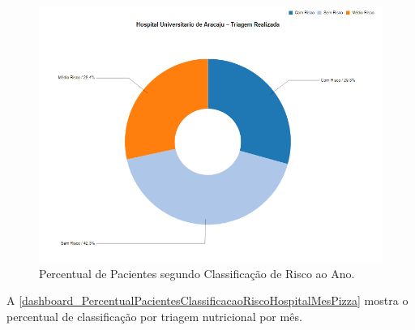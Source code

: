 \begin{figure}[htb]
	\caption{\label{dashboard_PercentualClassificacaoRiscoHospitalAnoPizza}Percentual de Pacientes segundo Classificação de Risco ao Ano.}
	\begin{center}
	    \includegraphics[scale=0.6]{Imagens/2.1.PercentualPacientesClassificacaoRiscoHospitalAnoPizza.png}
	\end{center}
\end{figure}

\clearpage
A \autoref{dashboard_PercentualPacientesClassificacaoRiscoHospitalMesPizza} mostra o percentual de classificação por triagem nutricional por mês.

